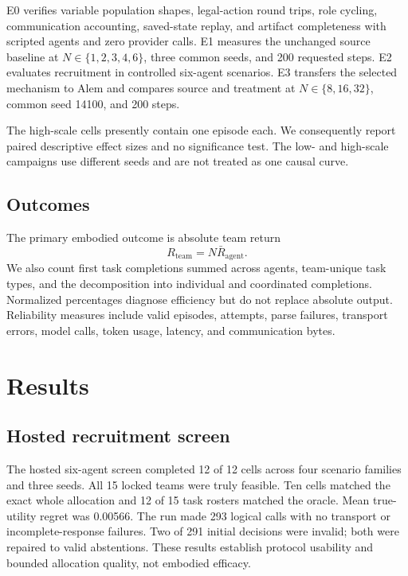 \documentclass[letterpaper]{article} %
\begin{document}
E0 verifies variable population shapes, legal-action round trips, role cycling,
communication accounting, saved-state replay, and artifact completeness with
scripted agents and zero provider calls.  E1 measures the unchanged source
baseline at \(N\in\{1,2,3,4,6\}\), three common seeds, and 200 requested steps.
E2 evaluates recruitment in controlled six-agent scenarios.  E3 transfers the
selected mechanism to Alem and compares source and treatment at
\(N\in\{8,16,32\}\), common seed 14100, and 200 steps.

The high-scale cells presently contain one episode each.  We consequently
report paired descriptive effect sizes and no significance test.  The low- and
high-scale campaigns use different seeds and are not treated as one causal
curve.

\subsection{Outcomes}

The primary embodied outcome is absolute team return
\[
R_{\mathrm{team}} = N\bar R_{\mathrm{agent}}.
\]
We also count first task completions summed across agents, team-unique task
types, and the decomposition into individual and coordinated completions.
Normalized percentages diagnose efficiency but do not replace absolute output.
Reliability measures include valid episodes, attempts, parse failures,
transport errors, model calls, token usage, latency, and communication bytes.

\section{Results}

\subsection{Hosted recruitment screen}

The hosted six-agent screen completed 12 of 12 cells across four scenario
families and three seeds.  All 15 locked teams were truly feasible.  Ten cells
matched the exact whole allocation and 12 of 15 task rosters matched the
oracle.  Mean true-utility regret was 0.00566.  The run made 293 logical calls
with no transport or incomplete-response failures.  Two of 291 initial
decisions were invalid; both were repaired to valid abstentions.  These results
establish protocol usability and bounded allocation quality, not embodied
efficacy.
\end{document}
